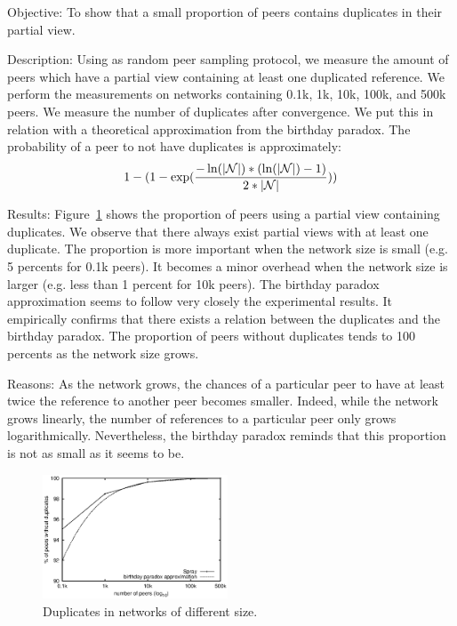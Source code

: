\begin{asparadesc} 
\item[Objective:] To show that a small proportion of peers contains duplicates
  in their partial view.
\item[Description:] Using \SPRAY as random peer sampling protocol, we measure
  the amount of peers which have a partial view containing at least one
  duplicated reference. We perform the measurements on networks containing
  0.1k, 1k, 10k, 100k, and 500k peers. We measure the number of duplicates
  after convergence. We put this in relation with a theoretical approximation
  from the birthday paradox. The probability of a peer to not have duplicates
  is approximately:
  \begin{equation}
    1- 
    (1-
    \exp({-\ln(|\mathcal{N}|)*(\ln(|\mathcal{N}|)-1)\over{2*|\mathcal{N}|}}))
  \end{equation}
\item[Results:] Figure~\ref{fig:duplicates} shows the proportion of peers using
  a partial view containing duplicates. We observe that there always exist
  partial views with at least one duplicate. The proportion is more important
  when the network size is small (e.g. 5 percents for 0.1k peers). It becomes a
  minor overhead when the network size is larger (e.g. less than 1 percent for
  10k peers). The birthday paradox approximation seems to follow very closely
  the experimental results. It empirically confirms that there exists a relation
  between the duplicates and the birthday paradox. The proportion of peers
  without duplicates tends to 100 percents as the network size grows.
\item[Reasons:] As the network grows, the chances of a particular peer to have
  at least twice the reference to another peer becomes smaller. Indeed, while
  the network grows linearly, the number of references to a particular peer
  only grows logarithmically. Nevertheless, the birthday paradox reminds that
  this proportion is not as small as it seems to be.
\end{asparadesc}

\begin{figure}
  \centering
  \includegraphics[width=0.49\textwidth]{img/duplicates.eps}
  \caption{\label{fig:duplicates}Duplicates in networks of different size.}
\end{figure}

